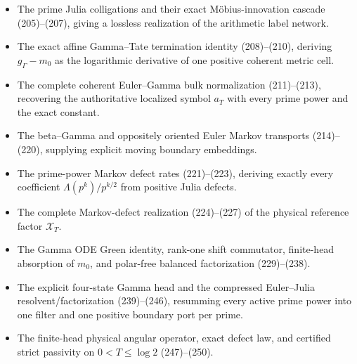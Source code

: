 \documentclass[11pt]{article}
\begin{document}
\begin{itemize}
      $g_\Gamma$ as an unbounded affine cocycle energy rather than a bounded
      coherent-orbit distance.
\item The prime Julia colligations and their exact M\"obius-innovation
      cascade (205)--(207), giving a lossless realization of the arithmetic
      label network.
\item The exact affine Gamma--Tate termination identity (208)--(210), deriving
      $g_\Gamma-m_0$ as the logarithmic derivative of one positive coherent
      metric cell.
\item The complete coherent Euler--Gamma bulk normalization (211)--(213),
      recovering the authoritative localized symbol $a_T$ with every prime
      power and the exact constant.
\item The beta--Gamma and oppositely oriented Euler Markov transports
      (214)--(220), supplying explicit moving boundary embeddings.
\item The prime-power Markov defect rates (221)--(223), deriving exactly
      every coefficient $\Lambda(p^k)/p^{k/2}$ from positive Julia defects.
\item The complete Markov-defect realization (224)--(227) of the physical
      reference factor $\mathcal X_T$.
\item The Gamma ODE Green identity, rank-one shift commutator, finite-head
      absorption of $m_0$, and polar-free balanced factorization
      (229)--(238).
\item The explicit four-state Gamma head and the compressed Euler--Julia
      resolvent/factorization (239)--(246), resumming every active prime power
      into one filter and one positive boundary port per prime.
\item The finite-head physical angular operator, exact defect law, and
      certified strict passivity on $0<T\le\log2$ (247)--(250).
\end{itemize}
\end{document}
